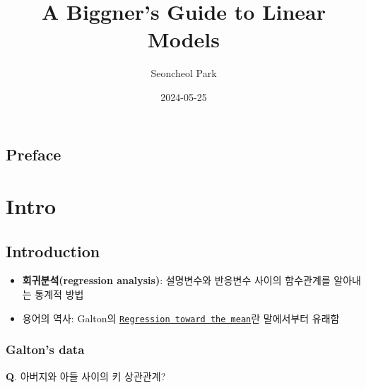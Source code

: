 \documentclass[
  letterpaper,
  DIV=11,
  numbers=noendperiod]{scrreprt}
\title{A Biggner's Guide to Linear Models}
\author{Seoncheol Park}
\date{2024-05-25}
\newenvironment{Shaded}{\begin{snugshade}}{\end{snugshade}}
\newcommand{\AttributeTok}[1]{\textcolor[rgb]{0.40,0.45,0.13}{#1}}
\newcommand{\FunctionTok}[1]{\textcolor[rgb]{0.28,0.35,0.67}{#1}}
\newcommand{\NormalTok}[1]{\textcolor[rgb]{0.00,0.23,0.31}{#1}}
\newcommand{\OtherTok}[1]{\textcolor[rgb]{0.00,0.23,0.31}{#1}}
\newcommand{\SpecialCharTok}[1]{\textcolor[rgb]{0.37,0.37,0.37}{#1}}
\newcommand{\StringTok}[1]{\textcolor[rgb]{0.13,0.47,0.30}{#1}}
\renewcommand*\contentsname{Table of contents}
\newcommand\contentsname{Table of contents}
\theoremstyle{definition}
\theoremstyle{plain}
\theoremstyle{remark}
\begin{document}
\maketitle

\renewcommand{\Return}{\State \textbf{return}~}
\newcommand{\Print}{\State \textbf{print}~}
\newcommand{\Break}{\State \textbf{break}}
\newcommand{\Continue}{\State \textbf{continue}}
\newcommand{\True}{\textbf{true}}
\newcommand{\False}{\textbf{false}}
\renewcommand{\And}{\textbf{and}~}
\newcommand{\Or}{\textbf{or}~}
\renewcommand{\Not}{\textbf{not}~}
\newcommand{\To}{\textbf{to}~}
\newcommand{\DownTo}{\textbf{downto}~}


\renewcommand*\contentsname{Table of contents}
{
\hypersetup{linkcolor=}
\setcounter{tocdepth}{2}
\tableofcontents
}

\chapter*{Preface}\label{preface}


\part{Intro}

\chapter{Introduction}\label{introduction}

\begin{itemize}
\item
  \textbf{회귀분석(regression analysis)}: 설명변수와 반응변수 사이의
  함수관계를 알아내는 통계적 방법
\item
  용어의 역사: Galton의
  \href{https://en.wikipedia.org/wiki/Regression_toward_the_mean}{\texttt{Regression\ toward\ the\ mean}}란
  말에서부터 유래함
\end{itemize}

\section{Galton's data}\label{galtons-data}

\textbf{Q}. 아버지와 아들 사이의 키 상관관계?

\begin{Shaded}
\end{Shaded}
\end{document}
